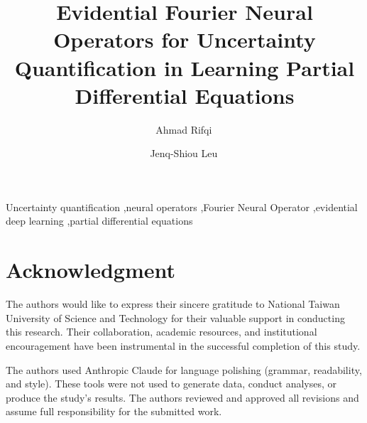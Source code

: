 \documentclass[review,12pt]{elsarticle}
\begin{document}
\begin{frontmatter}

\title{Evidential Fourier Neural Operators for Uncertainty Quantification in Learning Partial Differential Equations}

\author[ntust]{Ahmad Rifqi\,}

\author[ntust]{Jenq-Shiou Leu\,}




\begin{keyword}
Uncertainty quantification \sep neural operators \sep Fourier Neural Operator \sep evidential deep learning \sep partial differential equations
\end{keyword}

\end{frontmatter}


\section*{Acknowledgment}
The authors would like to express their sincere gratitude to National Taiwan University of Science and Technology for
their valuable support in conducting this research. Their collaboration, academic resources, and institutional
encouragement have been instrumental in the successful completion of this study.

The authors used Anthropic Claude for language polishing (grammar, readability, and style). These tools were not
used to generate data, conduct analyses, or produce the study's results. The authors reviewed and approved all
revisions and assume full responsibility for the submitted work.





\end{document}
